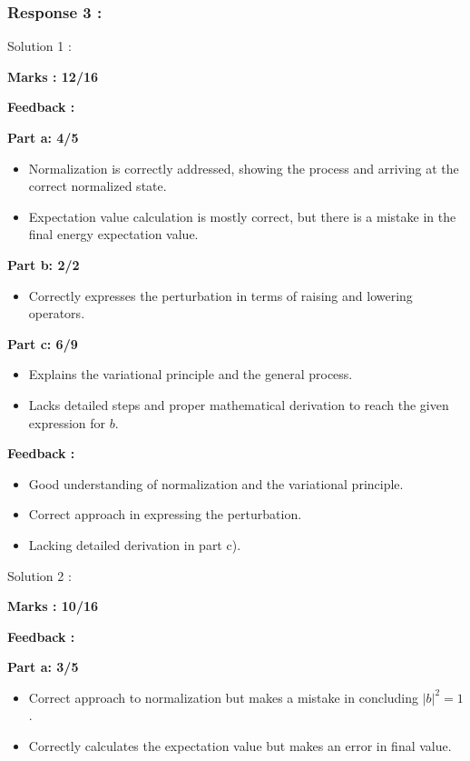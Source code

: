 \documentclass[a4paper,11pt]{article}
\begin{document}
\subsubsection*{Response 3 :}

Solution 1 :

\textbf{Marks : 12/16}

\textbf{Feedback :}

\textbf{Part a: 4/5}
\begin{itemize}
    \item Normalization is correctly addressed, showing the process and arriving at the correct normalized state.
    \item Expectation value calculation is mostly correct, but there is a mistake in the final energy expectation value.
\end{itemize}

\textbf{Part b: 2/2}
\begin{itemize}
    \item Correctly expresses the perturbation in terms of raising and lowering operators.
\end{itemize}

\textbf{Part c: 6/9}
\begin{itemize}
    \item Explains the variational principle and the general process.
    \item Lacks detailed steps and proper mathematical derivation to reach the given expression for $b$.
\end{itemize}

\textbf{Feedback :}
\begin{itemize}
    \item Good understanding of normalization and the variational principle.
    \item Correct approach in expressing the perturbation.
    \item Lacking detailed derivation in part c).
\end{itemize}


Solution 2 :

\textbf{Marks : 10/16}

\textbf{Feedback :}

\textbf{Part a: 3/5}
\begin{itemize}
    \item Correct approach to normalization but makes a mistake in concluding $|b|^2 = 1$.
    \item Correctly calculates the expectation value but makes an error in final value.
\end{itemize}
\end{document}
